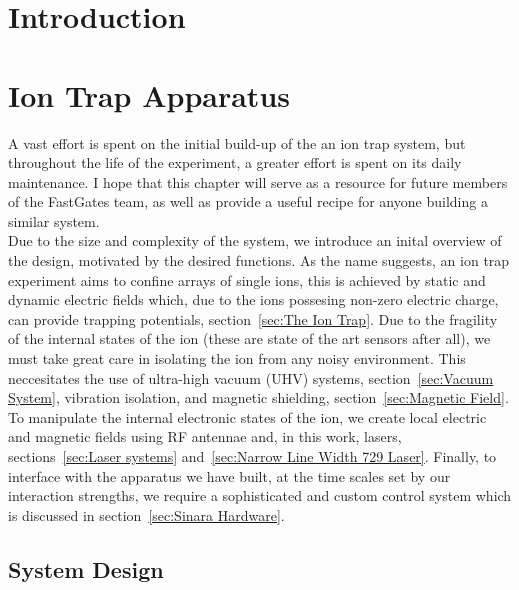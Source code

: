 \documentclass[12pt]{report}
\begin{document}

\chapter{Introduction}



\chapter{Ion Trap Apparatus}

A vast effort is spent on the initial build-up of the an ion trap system, but
throughout the life of the experiment, a greater effort is spent on its daily
maintenance.  I hope that this chapter will serve as a resource for future
members of the FastGates team, as well as provide a useful recipe for anyone
building a similar system. \\

Due to the size and complexity of the system, we introduce an inital overview of
the design, motivated by the desired functions.  As the name suggests, an ion
trap experiment aims to confine arrays of single ions, this is achieved by
static and dynamic electric fields which, due to the ions possesing non-zero
electric charge, can provide trapping potentials, section~\ref{sec:The Ion
Trap}. Due to the fragility of the internal states of the ion (these are state
of the art sensors after all), we must take great care in isolating the ion from
any noisy environment. This neccesitates the use of ultra-high vacuum (UHV)
systems, section~\ref{sec:Vacuum System}, vibration isolation, and magnetic
shielding, section~\ref{sec:Magnetic Field}. To manipulate the internal electronic states of the ion, we create
local electric and magnetic fields using RF antennae and, in this work, lasers,
sections~\ref{sec:Laser systems} and~\ref{sec:Narrow Line Width 729 Laser}.
Finally, to interface with the apparatus we have built, at the time scales set by our interaction strengths, we require a sophisticated and custom control system which is discussed in section~\ref{sec:Sinara Hardware}.

\section{System Design}
\label{sec:System Design}
\end{document}

